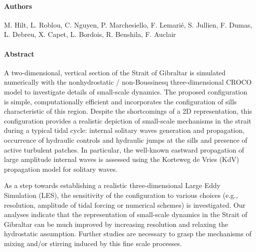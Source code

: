 




\paragraph{Authors} M. Hilt, L. Roblou, C. Nguyen, P. Marchesiello, F. Lemari\'e, S. Jullien, F. Dumas, L. Debreu, X. Capet, L. Bordois, R. Benshila, F. Auclair

\paragraph{Abstract}
A two-dimensional, vertical section of the Strait of Gibraltar is simulated numerically with the nonhydrostatic / non-Boussinesq three-dimensional CROCO model to investigate details of small-scale dynamics. The proposed configuration is simple, computationally efficient and incorporates the configuration of sills characteristic of this region.
%
Despite the shortcomings of a 2D representation, this configuration provides a realistic depiction of small-scale mechanisms in the strait during a typical tidal cycle: internal solitary waves generation and propagation, occurrence of hydraulic controls and hydraulic jumps at the sills and presence of active turbulent patches. In particular, the well-known eastward propagation of large amplitude internal waves is assessed using the Korteweg de Vries (KdV) propagation model for solitary waves.

As a step towards establishing a realistic three-dimensional Large Eddy Simulation (LES), the sensitivity of the configuration to various choices (e.g., resolution, amplitude of tidal forcing or numerical schemes) is investigated. Our analyses indicate that the representation of small-scale dynamics in the Strait of Gibraltar can be much improved by increasing resolution and relaxing the hydrostatic assumption. Further studies are necessary to grasp the mechanisms of mixing and/or stirring induced by this fine scale processes.

